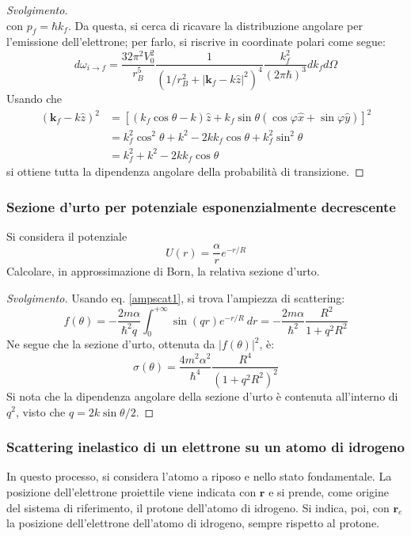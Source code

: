 \documentclass[11pt, a4paper]{scrartcl} %
\numberwithin{equation}{subsection}
\theoremstyle{style2}
\theoremstyle{style1}
\renewcommand\qedsymbol{$\blacksquare$}
\newenvironment{svolgimento}{\renewcommand\qedsymbol{$\spadesuit$}\begin{proof}[Svolgimento]}{\end{proof}}
\begin{document}
\begin{svolgimento}
\[\] 
con $p_f = \hbar k_f$.
Da questa, si cerca di ricavare la distribuzione angolare per l'emissione dell'elettrone; per farlo, si riscrive in coordinate polari come segue:
\[
d\omega_{i\to f}  = \frac{32 \pi^2 V_0^2}{r_B^5} \frac{1}{\left(1 / r_B^2 + \lvert \mathbf{k} _f - k \hat{z} \rvert ^2\right) ^4}\frac{k_f^2}{(2\pi\hbar )^3} dk_f d\Omega 
\] 
Usando che 
\[
\begin{split}
	(\mathbf{k} _f - k \hat{z})^2 &= \left[ (k_f \cos \theta - k ) \hat{z} + k_f \sin \theta  (\cos \varphi  \hat{x} + \sin \varphi  \hat{y}) \right] ^2 \\
				      &= k_f^2 \cos ^2 \theta + k^2 - 2 k k_f \cos \theta  + k_f^2 \sin^2 \theta \\
				      &= k_f^2 + k^2 - 2k k_f \cos \theta 
\end{split}
\] 
si ottiene tutta la dipendenza angolare della probabilit\`a di transizione.
\end{svolgimento}

\subsubsection{Sezione d'urto per potenziale esponenzialmente decrescente}

Si considera il potenziale	
\[
U(r) = \frac{\alpha}{r} e^{- r / R} 
\] 
Calcolare, in approssimazione di Born, la relativa sezione d'urto.
\begin{svolgimento}
	Usando eq. \ref{ampscat1}, si trova l'ampiezza di scattering:
	\[
	f(\theta ) = - \frac{2m\alpha }{\hbar ^2q} \int_{0} ^{+\infty} \sin(qr) e^{-r / R} \ dr = - \frac{2m \alpha }{\hbar ^2} \frac{R^2}{1+ q^2 R^2}
	\] 
	Ne segue che la sezione d'urto, ottenuta da $\lvert f(\theta ) \rvert ^2$, \`e:
	\begin{equation}
		\sigma (\theta ) = \frac{4 m^2 \alpha ^2}{\hbar ^4} \frac{R^4}{(1+q^2 R^2)^2}
	\end{equation}
	Si nota che la dipendenza angolare della sezione d'urto \`e contenuta all'interno di $q^2$, visto che $q = 2k \sin \theta / 2$.
\end{svolgimento}

\subsubsection{Scattering inelastico di un elettrone su un atomo di idrogeno}

In questo processo, si considera l'atomo a riposo e nello stato fondamentale. 
La posizione dell'elettrone proiettile viene indicata con $\mathbf{r} $ e si prende, come origine del sistema di riferimento, il protone dell'atomo di idrogeno.
Si indica, poi, con $\mathbf{r} _e$ la posizione dell'elettrone dell'atomo di idrogeno, sempre rispetto al protone.
\end{document}
